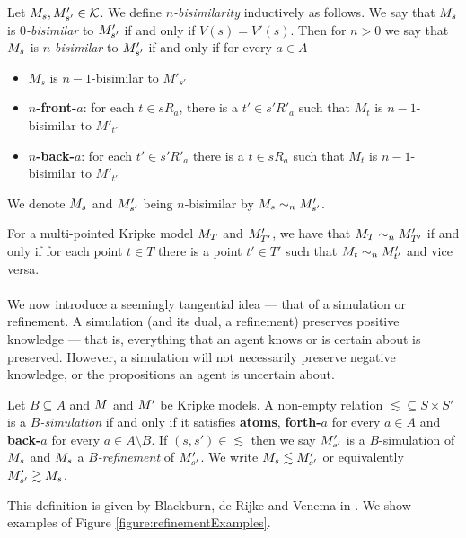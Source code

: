 \begin{defn} \label{nBisimKripke}
Let $M_s, M'_{s'} \in \mathcal{K}$.
We define {\em $n$-bisimilarity} inductively as follows.
We say that $M_s$ is {\em $0$-bisimilar} to $M'_{s'}$ if and only if $V(s) = V'(s)$.
Then for $n > 0$ we say that $M_s$ is {\em $n$-bisimilar} to $M'_{s'}$ if and only if for every $a \in A$
\begin{itemize}
	\item $M_s$ is $n-1$-bisimilar to $M'_{s'}$
	\item {\bf $n$-front-$a$}: for each $t \in s R_a$, there is a $t' \in s' R'_a$ such that $M_t$ is
	$n-1$-bisimilar to $M'_{t'}$
	\item {\bf $n$-back-$a$}: for each $t' \in s' R'_a$ there is a $t \in s R_a$ such that $M_t$ is
	$n-1$-bisimilar to $M'_{t'}$
\end{itemize}
We denote $M_s$ and $M'_{s'}$ being $n$-bisimilar by $M_s \sim_n
M'_{s'}$.
\end{defn}

For a multi-pointed Kripke model $M_T$ and $M'_{T'}$, we have that
$M_T \sim_n
M'_{T'}$ if and only if for each point $t \in T$ there is a point $t' \in T'$
such that $M_t \sim_n M'_{t'}$ and vice versa.\\
\\
We now introduce a seemingly tangential idea --- that of a simulation or refinement.
A simulation (and its dual, a refinement) preserves positive knowledge --- that is, everything that an agent knows or is certain
about is preserved.
However, a simulation will not necessarily preserve negative knowledge, or the propositions an agent
is uncertain about.

\begin{defn} \label{refinement}
Let $B \subseteq A$ and $M$ and $M'$ be Kripke models. A non-empty relation $\lesssim \subseteq S
\times S'$ is a {\em $B$-simulation} if and only if it satisfies {\bf atoms}, {\bf forth-$a$} for
every $a \in A$ and {\bf back-$a$} for every $a \in A \setminus B$.
If $(s, s') \in \lesssim$ then we say $M'_{s'}$ is a
$B$-simulation of $M_s$ and
$M_s$ a {\em $B$-refinement} of $M'_{s'}$.
We write $M_{s} \lesssim M'_{s'}$ or equivalently
$M'_{s'} \gtrsim M_{s}$.
\end{defn}

This definition is given by Blackburn, de Rijke and Venema in \cite{blackburn2002modal}.
We show examples of Figure \ref{figure:refinementExamples}.

